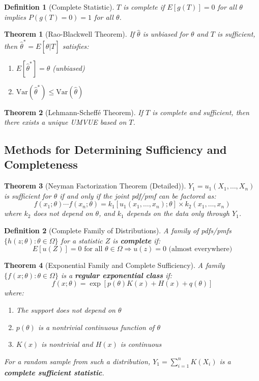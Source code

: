 \documentclass[12pt,a4paper]{amsart}
\newtheorem{theorem}{Theorem}[section]
\newtheorem{definition}{Definition}[section]
\theoremstyle{remark}
\begin{document}
\begin{definition}[Complete Statistic]
$T$ is complete if $E[g(T)] = 0$ for all $\theta$ implies $P(g(T) = 0) = 1$ for all $\theta$.
\end{definition}

\begin{theorem}[Rao-Blackwell Theorem]
If $\hat{\theta}$ is unbiased for $\theta$ and $T$ is sufficient, then $\hat{\theta}^* = E[\hat{\theta}|T]$ satisfies:
\begin{enumerate}
\item $E[\hat{\theta}^*] = \theta$ (unbiased)
\item $\text{Var}(\hat{\theta}^*) \leq \text{Var}(\hat{\theta})$
\end{enumerate}
\end{theorem}

\begin{theorem}[Lehmann-Scheffé Theorem]
If $T$ is complete and sufficient, then there exists a unique UMVUE based on $T$.
\end{theorem}

\subsection{Methods for Determining Sufficiency and Completeness}

\begin{theorem}[Neyman Factorization Theorem (Detailed)]
$Y_1 = u_1(X_1, \ldots, X_n)$ is sufficient for $\theta$ if and only if the joint pdf/pmf can be factored as:
$$f(x_1; \theta) \cdots f(x_n; \theta) = k_1[u_1(x_1, \ldots, x_n); \theta] \times k_2(x_1, \ldots, x_n)$$
where $k_2$ does not depend on $\theta$, and $k_1$ depends on the data only through $Y_1$.
\end{theorem}

\begin{definition}[Complete Family of Distributions]
A family of pdfs/pmfs $\{h(z; \theta): \theta \in \Omega\}$ for a statistic $Z$ is \textbf{complete} if:
$$E[u(Z)] = 0 \text{ for all } \theta \in \Omega \Rightarrow u(z) = 0 \text{ (almost everywhere)}$$
\end{definition}

\begin{theorem}[Exponential Family and Complete Sufficiency]
A family $\{f(x; \theta): \theta \in \Omega\}$ is a \textbf{regular exponential class} if:
$$f(x; \theta) = \exp[p(\theta) K(x) + H(x) + q(\theta)]$$
where:
\begin{enumerate}
\item The support does not depend on $\theta$
\item $p(\theta)$ is a nontrivial continuous function of $\theta$
\item $K(x)$ is nontrivial and $H(x)$ is continuous
\end{enumerate}

For a random sample from such a distribution, $Y_1 = \sum_{i=1}^n K(X_i)$ is a \textbf{complete sufficient statistic}.
\end{theorem}
\end{document}
